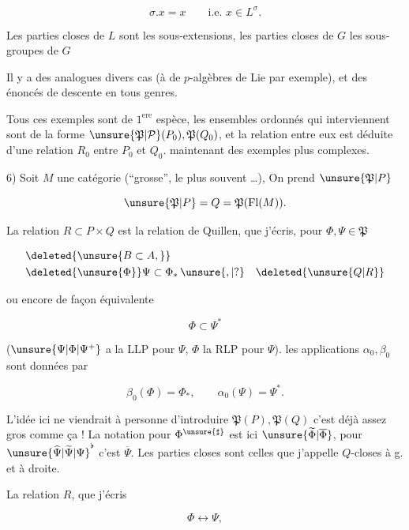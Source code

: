 \[
 \sigma.x=x\qquad\text{i.e. }x\in L^\sigma.
\]

Les parties closes de $L$ sont les sous-extensions, les parties closes de $G$ les sous-groupes de $G$

Il y a des  analogues divers  cas  (à  de $p$-algèbres de Lie par exemple), et des énoncés de descente en tous genres.

 Tous ces exemples sont de $1^{\mathrm{ere}}$ espèce, les ensembles ordonnés qui interviennent sont de la forme $\unsure{\mathfrak P|\mathcal P}(P_0),\mathfrak P(Q_0)$, et la relation entre eux est déduite d'une relation $R_0$ entre $P_0$ et $Q_0$.  maintenant des exemples plus complexes.

6) Soit $M$ une catégorie (``grosse'', le plus souvent \ldots), On prend $\unsure{\mathfrak P|P}$

\[
 \unsure{\mathfrak P|P}=Q=\mathfrak P(\mathrm{Fl}(M)).
\]

La relation $R\subset P\times Q$ est la relation de Quillen, que j'écris, pour $\Phi,\Psi\in\mathfrak P$

\[
 \begin{aligned}
 &\deleted{\unsure{B\subset A,}}\\
 &\deleted{\unsure{\Phi}}\Psi\subset\Phi_*\,\unsure{,|?}\quad\deleted{\unsure{Q|R}}
 \end{aligned}
\]

ou encore de façon équivalente

\[
 \Phi\subset\Psi^*
\]

($\unsure{\Psi|\Phi|\Psi^{+}}$ a la LLP pour $\Psi$, $\Phi$ la RLP pour $\Psi$).   les applications $\alpha_0,\beta_0$ sont données par

\[
 \beta_0(\Phi)=\Phi_*,\qquad \alpha_0(\Psi)=\Psi^*.
\]

L'idée ici ne viendrait à personne d'introduire $\mathfrak P(P),\mathfrak P(Q)$  c'est déjà assez gros comme ça ! La notation pour $\Phi^{\unsure{\sharp}}$ est ici $\unsure{\widetilde\Phi|\overline\Phi}$, pour $\unsure{\widehat{\Psi}|\widetilde{\Psi}|\Psi}^\flat$ c'est $\overline\Psi$. Les parties closes sont celles que j'appelle $Q$-closes à g. et à droite.

La relation $R$, que j'écris

\[
 \Phi\longleftrightarrow\Psi,
\]

